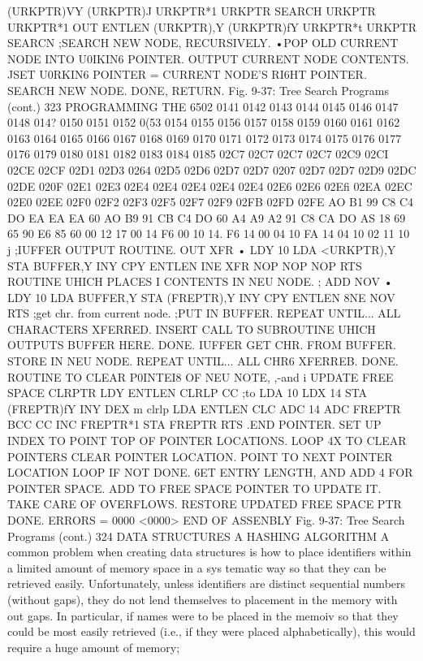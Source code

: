\documentclass{book}
\begin{document}
{{{{{{{{{{{{{{{{{{{{{{{{{{{{{{{{{{{{{{{{{{{{{{{{{{{{{{{{{{{(URKPTR)VY
(URKPTR)J
URKPTR*1
URKPTR
SEARCH
URKPTR
URKPTR*1
OUT
ENTLEN
(URKPTR),Y
(URKPTR)fY
URKPTR*t
URKPTR
SEARCN
;SEARCH NEW NODE, RECURSIVELY.
•POP OLD CURRENT NODE INTO U0IKIN6 POINTER.
{OUTPUT CURRENT NODE CONTENTS.
JSET U0RKIN6 POINTER =
{CURRENT NODE'S RI6HT POINTER.
{SEARCH NEW NODE.
{DONE, RETURN.
Fig. 9-37: Tree Search Programs (cont.)
323
PROGRAMMING THE 6502
0141
0142
0143
0144
0145
0146
0147
0148
014?
0150
0151
0152
0(53
0154
0155
0156
0157
0158
0159
0160
0161
0162
0163
0164
0165
0166
0167
0168
0169
0170
0171
0172
0173
0174
0175
0176
0177
0176
0179
0180
0181
0182
0183
0184
0185
02C7
02C7
02C7
02C7
02C9
02CI
02CE
02CF
02D1
02D3
0264
02D5
02D6
02D7
02D7
0207
02D7
02D7
02D9
02DC
02DE
020F
02E1
02E3
02E4
02E4
02E4
02E4
02E4
02E6
02E6
02Efi
02EA
02EC
02E0
02EE
02F0
02F2
02F3
02F5
02F7
02F9
02FB
02FD
02FE
AO
B1
99
C8
C4
DO
EA
EA
EA
60
AO
B9
91
CB
C4
DO
60
A4
A9
A2
91
C8
CA
DO
AS
18
69
65
90
E6
85
60
00
12
17 00
14
F6
00
10
14.
F6
14
00
04
10
FA
14
04
10
02
11
10
j
;IUFFER OUTPUT ROUTINE.
{
OUT
XFR
•
LDY 10
LDA <URKPTR),Y
STA BUFFER,Y
INY
CPY ENTLEN
INE XFR
NOP
NOP
NOP
RTS
{ROUTINE UHICH PLACES I
{CONTENTS IN NEU NODE.
;
ADD
NOV
•
LDY 10
LDA BUFFER,Y
STA (FREPTR),Y
INY
CPY ENTLEN
8NE NOV
RTS
;get chr. from current node.
;PUT IN BUFFER.
{REPEAT UNTIL...
{ALL CHARACTERS XFERRED.
{INSERT CALL TO SUBROUTINE
{UHICH OUTPUTS BUFFER HERE.
{DONE.
IUFFER
{GET CHR. FROM BUFFER.
{STORE IN NEU NODE.
{REPEAT UNTIL...
{ALL CHR6 XFERREB.
{DONE.
{ROUTINE TO CLEAR P0INTEI8 OF NEU NOTE,
,-and i
{
UPDATE FREE SPACE
CLRPTR LDY ENTLEN
CLRLP
CC
;to
LDA 10
LDX 14
STA (FREPTR)fY
INY
DEX
m clrlp
LDA ENTLEN
CLC
ADC 14
ADC FREPTR
BCC CC
INC FREPTR*1
STA FREPTR
RTS
.END
POINTER.
{SET UP INDEX TO POINT
TOP OF POINTER LOCATIONS.
{LOOP 4X TO CLEAR POINTERS
{CLEAR POINTER LOCATION.
{POINT TO NEXT POINTER LOCATION
{LOOP IF NOT DONE.
{6ET ENTRY LENGTH,
{AND ADD 4 FOR POINTER SPACE.
{ADD TO FREE SPACE POINTER TO
{UPDATE IT.
{TAKE CARE OF OVERFLOWS.
{RESTORE UPDATED FREE SPACE PTR
{DONE.
ERRORS = 0000 <0000>
END OF ASSENBLY
Fig. 9-37: Tree Search Programs (cont.)
324
DATA STRUCTURES
A HASHING ALGORITHM
A common problem when creating data structures is how to place
identifiers within a limited amount of memory space in a sys
tematic way so that they can be retrieved easily. Unfortunately,
unless identifiers are distinct sequential numbers (without gaps),
they do not lend themselves to placement in the memory with
out gaps. In particular, if names were to be placed in the memoiv so
that they could be most easily retrieved (i.e., if they were placed
alphabetically), this would require a huge amount of memory;
}}}}}}}}}}}}}}}}}}}}}}}}}}}}}}}}}}}}}}}}}}}}}}}}}}}}}}}}}}}}}}}}}}}}}}}}}}}}}}}}}}}}}}}}}}
\end{document}

